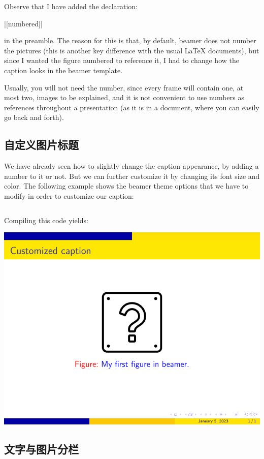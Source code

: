 Observe that I have added the declaration:

|[numbered]|

in the preamble. The reason for this is that, by default, beamer does not number
the pictures (this is another key difference with the usual {\LaTeX} documents), but since I wanted the figure numbered to reference it, I had to change how the caption looks in the beamer template.

Usually, you will not need the number, since every frame will contain one, at most two, images to be explained, and it is not convenient to use numbers as references throughout a presentation (as it is in a document, where you can easily go back and forth).

\subsection{自定义图片标题}

We have already seen how to slightly change the caption appearance, by adding a number to it or not. But we can further customize it by changing its font size and color. The following example shows the beamer theme options that we have to modify in order to customize our caption:

\inputminted[linenos=true]{latex}{examples/beamer/beamerfigure03.tex}

Compiling this code yields:

\includegraphics{examples/beamer/beamerfigure03.pdf}

\subsection{文字与图片分栏}

